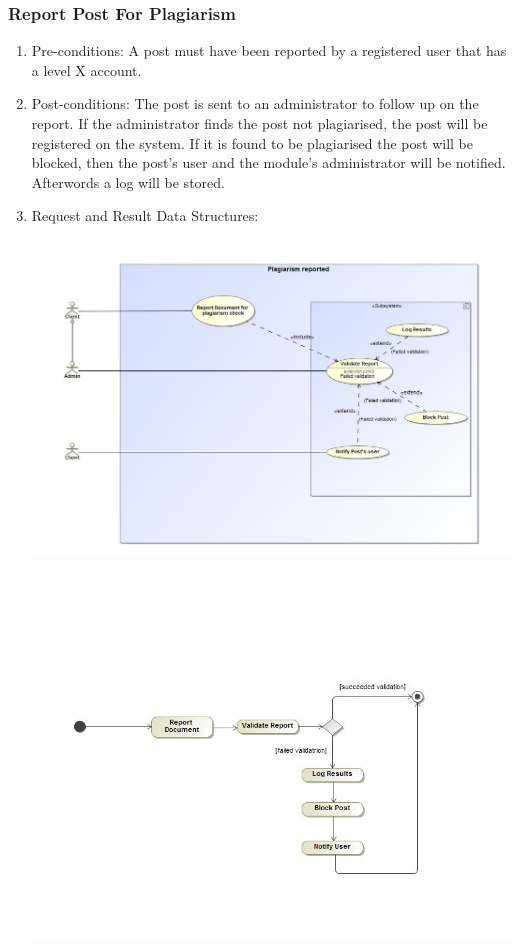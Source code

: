 \documentclass[hidelinks, 12pt, oneside]{article}
\begin{document}
\subsubsection{Report Post For Plagiarism}
\begin{enumerate}
 \item Pre-conditions: A post must have been reported by a registered user that has a level X account. 

 
 \item Post-conditions: The post is sent to an administrator to follow up on the report. If the administrator finds the post not plagiarised, the post will be registered on the system. If it is found to be plagiarised the post will be blocked, then the post's user and the module's administrator will be notified. Afterwords a log will be stored. 

 \item Request and Result Data Structures:\\
  \centerline{\includegraphics[scale=0.4]{plagiarismReportUC}}\\
 \centerline{\includegraphics[scale=0.35]{plagiarismReportAD}} 
\end{enumerate}
\end{document}

